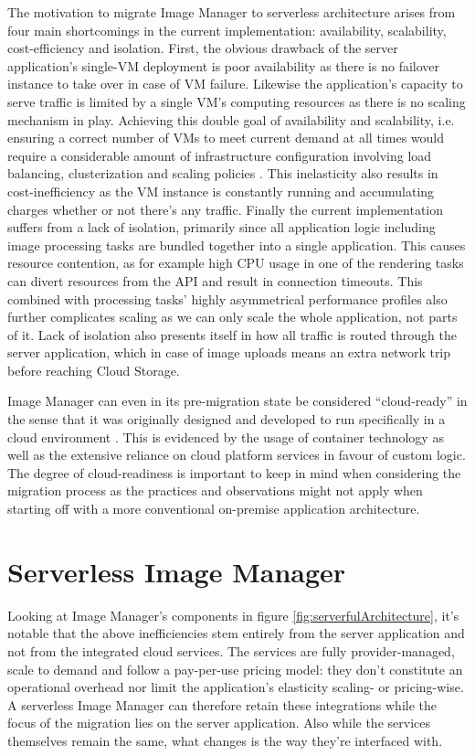 The motivation to migrate Image Manager to serverless architecture arises from four main shortcomings in the current implementation: availability, scalability, cost-efficiency and isolation. First, the obvious drawback of the server application's single-VM deployment is poor availability as there is no failover instance to take over in case of VM failure. Likewise the application's capacity to serve traffic is limited by a single VM's computing resources as there is no scaling mechanism in play. Achieving this double goal of availability and scalability, i.e. ensuring a correct number of VMs to meet current demand at all times would require a considerable amount of infrastructure configuration involving load balancing, clusterization and scaling policies \parencite{jonas19berkeleyView}. This inelasticity also results in cost-inefficiency as the VM instance is constantly running and accumulating charges whether or not there's any traffic. Finally the current implementation suffers from a lack of isolation, primarily since all application logic including image processing tasks are bundled together into a single application. This causes resource contention, as for example high CPU usage in one of the rendering tasks can divert resources from the API and result in connection timeouts. This combined with processing tasks' highly asymmetrical performance profiles also further complicates scaling as we can only scale the whole application, not parts of it. Lack of isolation also presents itself in how all traffic is routed through the server application, which in case of image uploads means an extra network trip before reaching Cloud Storage.

Image Manager can even in its pre-migration state be considered ``cloud-ready'' in the sense that it was originally designed and developed to run specifically in a cloud environment \parencite{pozdniakova17cloudready}. This is evidenced by the usage of container technology as well as the extensive reliance on cloud platform services in favour of custom logic. The degree of cloud-readiness is important to keep in mind when considering the migration process as the practices and observations might not apply when starting off with a more conventional on-premise application architecture.

\section{Serverless Image Manager}

Looking at Image Manager's components in figure \ref{fig:serverfulArchitecture}, it's notable that the above inefficiencies stem entirely from the server application and not from the integrated cloud services. The services are fully provider-managed, scale to demand and follow a pay-per-use pricing model: they don't constitute an operational overhead nor limit the application's elasticity scaling- or pricing-wise. A serverless Image Manager can therefore retain these integrations while the focus of the migration lies on the server application. Also while the services themselves remain the same, what changes is the way they're interfaced with.

